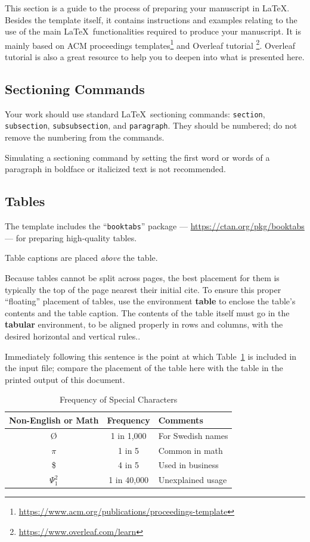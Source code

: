 This section is a guide to the process of preparing your manuscript in \LaTeX. Besides the template itself, it contains instructions and examples relating to the use of the main \LaTeX\  functionalities required to produce your manuscript. It is mainly based on ACM proceedings templates\footnote{\url{https://www.acm.org/publications/proceedings-template}} and Overleaf tutorial \footnote{\url{https://www.overleaf.com/learn}}. Overleaf tutorial is also a great resource to help you to deepen into what is presented here.

\subsection{Sectioning Commands}

Your work should use standard \LaTeX\ sectioning commands: \verb|section|, \verb|subsection|, \verb|subsubsection|, and \verb|paragraph|. They should be numbered; do not remove the numbering from the commands.

Simulating a sectioning command by setting the first word or words of a paragraph in boldface or italicized text is not recommended.

\subsection{Tables}

The template includes the ``\verb|booktabs|'' package --- \url{https://ctan.org/pkg/booktabs} --- for preparing high-quality tables.

Table captions are placed {\itshape above} the table.

Because tables cannot be split across pages, the best placement for them is typically the top of the page nearest their initial cite.  To ensure this proper ``floating'' placement of tables, use the environment \textbf{table} to enclose the table's contents and the table caption.  The contents of the table itself must go in the \textbf{tabular} environment, to be aligned properly in rows and columns, with the desired horizontal and vertical rules..

Immediately following this sentence is the point at which Table~\ref{tab:freq} is included in the input file; compare the placement of the table here with the table in the printed output of this document.

\begin{table}[ht]
	\centering
	\caption{Frequency of Special Characters}
	\label{tab:freq}
	\begin{tabular}{ccl}
		\toprule
		Non-English or Math&Frequency&Comments\\
		\midrule
		\O & 1 in 1,000& For Swedish names\\
		$\pi$ & 1 in 5& Common in math\\
		\$ & 4 in 5 & Used in business\\
		$\Psi^2_1$ & 1 in 40,000& Unexplained usage\\
		\bottomrule
	\end{tabular}
\end{table}

